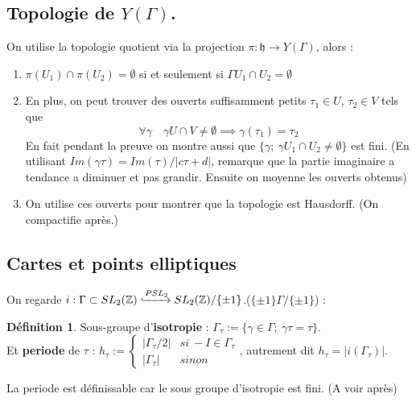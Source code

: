 \documentclass[12pt]{article}
\theoremstyle{plain}
\theoremstyle{definition}
\newtheorem{defn}[subsubsection]{D\'efinition}
\theoremstyle{remark}
\newcommand{\Z}{\mathbb{Z}}
\newcommand{\h}{\mathfrak{h}}
\begin{document}
\subsection{Topologie de $Y(\Gamma)$.}
On utilise la topologie quotient via la projection $\pi:\h\rightarrow Y(\Gamma)$, alors :
\begin{enumerate}
    \item $\pi(U_1)\cap\pi(U_2)=\emptyset$ si et seulement si $\Gamma U_1\cap U_2=\emptyset$
    \item En plus, on peut trouver des ouverts suffisamment petits $\tau_1\in U$, $\tau_2\in V$ tels que
     $$\forall\gamma\quad \gamma U\cap V\ne\emptyset \implies \gamma(\tau_1)=\tau_2$$En fait pendant la preuve on montre aussi 
     que $\{\gamma;~\gamma U_1\cap U_2\ne\emptyset\}$ est fini. (En utilisant $Im(\gamma\tau)=Im(\tau)/\lvert c\tau+d\rvert$, 
     remarque que la partie imaginaire a tendance a diminuer et pas grandir. Ensuite on moyenne les ouverts obtenus)
    \item On utilise ces ouverts pour montrer que la topologie est Hausdorff. (On compactifie après.)
\end{enumerate}

\subsection{Cartes et points elliptiques}
On regarde $i:\Gamma\subset SL_2(\Z)\xhookrightarrow{PSL_2} SL_2(\Z)/\{\pm1\}$.($\{\pm1\}\Gamma/\{\pm1\}$) :
\begin{defn}
    Sous-groupe d'\textbf{isotropie} : $\Gamma_{\tau}:=\{\gamma\in \Gamma;~\gamma\tau=\tau\}$. \\Et \textbf{periode} de $\tau$ :
    $h_{\tau}:=\begin{cases}
        \lvert \Gamma_{\tau}/2\rvert &si~-I\in\Gamma_{\tau}\\
        \lvert \Gamma_{\tau}\rvert &sinon
    \end{cases}$, autrement dit $h_{\tau}=\lvert i(\Gamma_{\tau})\rvert$.
\end{defn}

La periode est définissable car le sous groupe d'isotropie est fini. (A voir après) 
\end{document}
